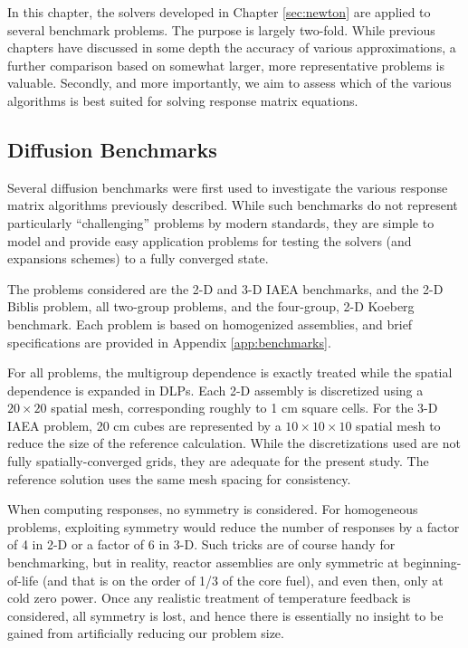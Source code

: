 In this chapter, the solvers developed in 
Chapter \ref{sec:newton} are applied to several benchmark
problems.  The purpose is largely two-fold.  While previous chapters 
have discussed in some depth the accuracy of various approximations,
a further comparison based on somewhat larger, more representative 
problems is valuable.  Secondly, and more importantly, we aim to 
assess which of the various algorithms is best suited for solving 
response matrix equations.

\subsection{Diffusion Benchmarks}

Several diffusion benchmarks were first used to investigate the 
various response matrix algorithms previously described.  While 
such benchmarks do not represent particularly 
``challenging'' problems by modern 
standards, they are simple to model and provide easy 
application problems for testing the solvers (and expansions schemes)
to a fully converged state.

The problems considered are the 2-D and 3-D IAEA benchmarks, and the 
2-D Biblis problem, all two-group problems, and the four-group, 2-D 
Koeberg benchmark.  Each problem is based on homogenized assemblies, 
and brief specifications are provided in Appendix \ref{app:benchmarks}.

For all problems, the multigroup dependence is exactly treated while the 
spatial dependence is expanded in DLPs.  Each 2-D assembly is discretized 
using a $20\times 20$ spatial mesh, corresponding roughly to 1 cm square 
cells.  For the 3-D IAEA problem, 20 cm cubes are represented by a
$10 \times 10 \times 10$ spatial mesh to reduce the size of the 
reference calculation.
While the discretizations used are not 
  fully spatially-converged grids, they are adequate 
 for the present study.  The reference solution uses the same 
mesh spacing for consistency.  

When computing responses, no symmetry is considered.  For homogeneous
problems, exploiting symmetry would reduce the number of responses 
by a factor of 4 in 2-D or a factor of 6 in 3-D.  Such tricks are 
of course handy for benchmarking, but in reality, reactor assemblies 
are only symmetric at beginning-of-life (and that is on the order 
of 1/3 of the core fuel), and even then, only at cold zero power.  Once
any realistic treatment of temperature feedback is considered, all 
symmetry is lost, and hence there is essentially no insight to be gained 
from artificially reducing our problem size.

